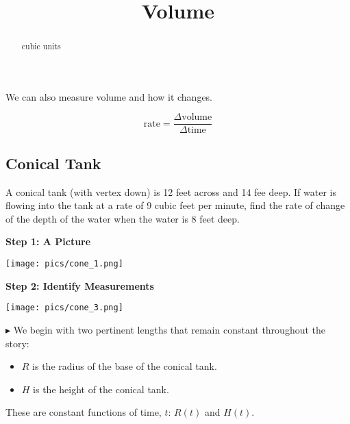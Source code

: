 \documentclass{ximera}
\title{Volume}
\begin{document}
\begin{abstract}
cubic units
\end{abstract}
\maketitle



We can also measure volume and how it changes.



\[
\text{rate} = \frac{\Delta \text{volume}}{\Delta \text{time}} 
\]








\subsection*{Conical Tank}

A conical tank (with vertex down) is 12 feet across and 14 fee deep. If water is flowing into the tank at a rate of 9 cubic feet per minute, find the rate of change of the depth of the water when the water is 8 feet deep.






\textbf{\textcolor{purple!85!blue}{Step 1: A Picture}}


\begin{image}
\texttt{[image: pics/cone\_1.png]}
\end{image}




\textbf{\textcolor{purple!85!blue}{Step 2: Identify Measurements}}






\begin{image}
\texttt{[image: pics/cone\_3.png]}
\end{image}






$\blacktriangleright$ We begin with two pertinent lengths that remain constant throughout the story:

\begin{itemize}
\item $R$ is the radius of the base of the conical tank.
\item $H$ is the height of the conical tank.
\end{itemize}

These are constant functions of time, $t$: $R(t)$ and $H(t)$.
\end{document}
